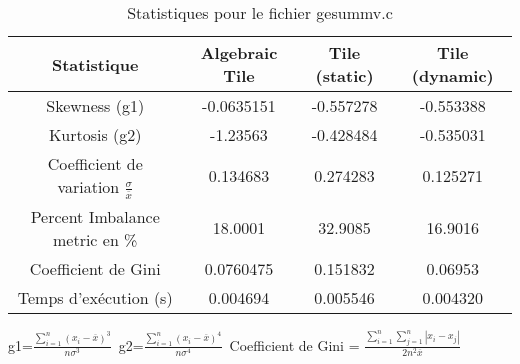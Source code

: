 \documentclass{article}
\begin{document}
\begin{table}[htbp]
  \centering
  \caption{Statistiques pour le fichier gesummv.c}
  \begin{tabular}{|c|c|c|c|}
    \hline
    Statistique & Algebraic Tile & Tile (static) & Tile (dynamic) \\ 
    \hline
    Skewness (g1)  & -0.0635151 & -0.557278 & -0.553388 \\ 
    Kurtosis (g2)  & -1.23563 & -0.428484 & -0.535031 \\ 
    Coefficient de variation $ \frac{\sigma}{\overline{x}} $ & 0.134683 & 0.274283 & 0.125271\\ 
    Percent Imbalance metric en \% & 18.0001 & 32.9085 & 16.9016\\ 
    Coefficient de Gini  & 0.0760475 & 0.151832 & 0.06953\\ 
    Temps d'exécution (s) &  0.004694    &  0.005546   &  0.004320   \\ 

    \hline
  \end{tabular}
\end{table}
g1=$ \frac{\sum_{i=1}^{n} (x_i - \overline{x})^3}{n\sigma^3} $\
g2=$ \frac{\sum_{i=1}^{n} (x_i - \overline{x})^4}{n\sigma^4} $\
Coefficient de Gini = $ \frac{\sum_{i=1}^{n}\sum_{j=1}^{n} |x_i - x_j|}{2n^2\overline{x}} $\
\newpage
\end{document}
